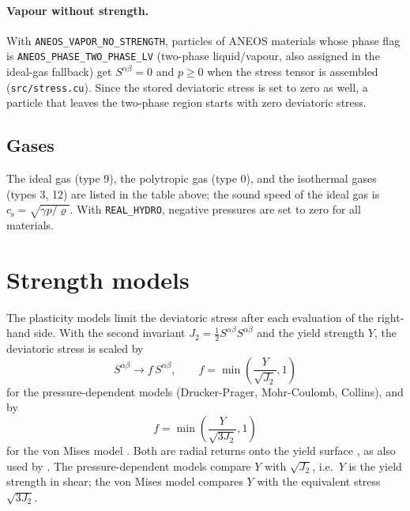 \documentclass[10pt,fleqn,twoside]{article}
\newcommand{\code}[1]{\texttt{#1}}
\newcommand{\sw}[1]{\texttt{#1}}
\begin{document}
\paragraph{Vapour without strength.} With \sw{ANEOS\_VAPOR\_NO\_STRENGTH}, particles of ANEOS materials whose phase
flag is \code{ANEOS\_PHASE\_TWO\_PHASE\_LV} (two-phase liquid/vapour, also assigned in the ideal-gas fallback) get
$S^{\alpha\beta} = 0$ and $p \geq 0$ when the stress tensor is assembled (\code{src/stress.cu}). Since the stored
deviatoric stress is set to zero as well, a particle that leaves the two-phase region starts with zero deviatoric
stress.

\subsection{Gases}
The ideal gas (type 9), the polytropic gas (type 0), and the isothermal gases (types 3, 12) are listed in the table
above; the sound speed of the ideal gas is $c_\mathrm{s} = \sqrt{\gamma p/\varrho}$.
With \sw{REAL\_HYDRO}, negative pressures are set to zero for all materials.


\section{Strength models}
\label{sec:plasticity}

The plasticity models limit the deviatoric stress after each evaluation of the right-hand side. With the second
invariant $J_2 = \frac{1}{2}S^{\alpha\beta}S^{\alpha\beta}$ and the yield strength $Y$, the deviatoric stress is
scaled by
\begin{equation}
 S^{\alpha\beta} \rightarrow f\,S^{\alpha\beta},\qquad
 f = \min\left(\frac{Y}{\sqrt{J_2}}, 1\right)
\end{equation}
for the pressure-dependent models (Drucker-Prager, Mohr-Coulomb, Collins), and by
\begin{equation}
 f = \min\left(\frac{Y}{\sqrt{3 J_2}}, 1\right)
\end{equation}
for the von Mises model \citep{vonmises1913}. Both are radial returns onto the yield surface \citep{wilkins1964},
as also used by \citet{libersky:1991}. The pressure-dependent models compare $Y$ with $\sqrt{J_2}$, i.e.\ $Y$ is the
yield strength in shear; the von Mises model compares $Y$ with the equivalent stress $\sqrt{3J_2}$.
\end{document}
